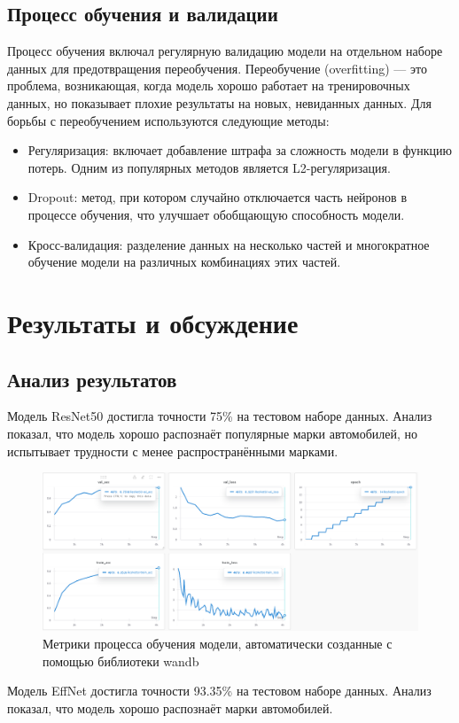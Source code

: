 \documentclass[14pt]{extarticle}
\begin{document}
\subsection{Процесс обучения и валидации}
\hspace{1cm}Процесс обучения включал регулярную валидацию модели на отдельном наборе данных для предотвращения переобучения. Переобучение (overfitting) — это проблема, возникающая, когда модель хорошо работает на тренировочных данных, но показывает плохие результаты на новых, невиданных данных. Для борьбы с переобучением используются следующие методы:
\begin{itemize}
    \item Регуляризация: включает добавление штрафа за сложность модели в функцию потерь. Одним из популярных методов является L2-регуляризация.
    \item Dropout: метод, при котором случайно отключается часть нейронов в процессе обучения, что улучшает обобщающую способность модели.
    \item Кросс-валидация: разделение данных на несколько частей и многократное обучение модели на различных комбинациях этих частей.
\end{itemize}

\section[Результаты и обсуждение]{\textbf{Результаты и обсуждение}}
\subsection[Анализ результатов]{\textbf{Анализ результатов}}

\hspace{1cm}Модель \foreignlanguage{english}{ResNet}50 достигла точности 75\% на тестовом наборе данных. Анализ показал, что модель
хорошо распознаёт популярные марки автомобилей, но испытывает трудности с менее распространёнными марками.

\begin{figure}[H]
\centering
\includegraphics[width=\textwidth]{images/9.png}
\caption{Метрики процесса обучения модели, автоматически созданные с помощью библиотеки \foreignlanguage{english}{wandb}}
\label{fig:9}
\end{figure}
\hspace{1cm}Модель \foreignlanguage{english}{EffNet} достигла точности 93.35\% на тестовом наборе данных. Анализ показал, что модель
хорошо распознаёт марки автомобилей.
\end{document}
